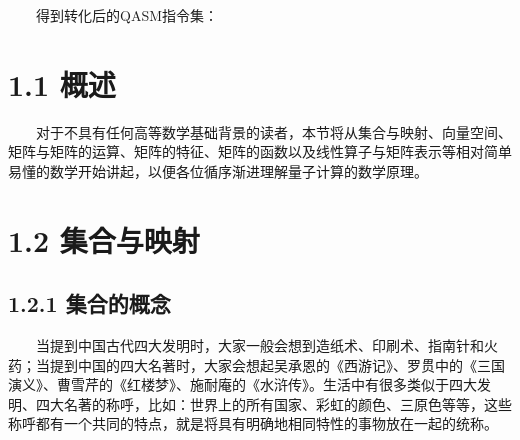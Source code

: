 \documentclass[a4paper,11pt,english]{sphinxmanual}
\begin{document}
\begin{sphinxVerbatim}[commandchars=\\\{\}]
    
\end{sphinxVerbatim}

\sphinxAtStartPar
  得到转化后的QASM指令集：

\begin{sphinxVerbatim}[commandchars=\\\{\}]
 
  \PYG{p}{[}\PYG{p}{]}
 \PYG{p}{[}\PYG{p}{]}
 \PYG{p}{[}\PYG{p}{]}
 \PYG{p}{[}\PYG{p}{]}
 \PYG{p}{[}\PYG{p}{]}
  \PYG{p}{[}\PYG{p}{]}
 \PYG{p}{[}\PYG{p}{]}  \PYG{p}{[}\PYG{p}{]}
\end{sphinxVerbatim}

\sphinxstepscope


\section{1.1 概述}
\label{\detokenize{rst/_u9644_u5f551_u91cf_u5b50_u8ba1_u7b97_u6570_u5b66_u57fa_u78401:id1}}\label{\detokenize{rst/_u9644_u5f551_u91cf_u5b50_u8ba1_u7b97_u6570_u5b66_u57fa_u78401::doc}}
\sphinxAtStartPar
  对于不具有任何高等数学基础背景的读者，本节将从集合与映射、向量空间、矩阵与矩阵的运算、矩阵的特征、矩阵的函数以及线性算子与矩阵表示等相对简单易懂的数学开始讲起，以便各位循序渐进理解量子计算的数学原理。


\section{1.2 集合与映射}
\label{\detokenize{rst/_u9644_u5f551_u91cf_u5b50_u8ba1_u7b97_u6570_u5b66_u57fa_u78401:id2}}

\subsection{1.2.1 集合的概念}
\label{\detokenize{rst/_u9644_u5f551_u91cf_u5b50_u8ba1_u7b97_u6570_u5b66_u57fa_u78401:id3}}
\sphinxAtStartPar
  当提到中国古代四大发明时，大家一般会想到造纸术、印刷术、指南针和火药；当提到中国的四大名著时，大家会想起吴承恩的《西游记》、罗贯中的《三国演义》、曹雪芹的《红楼梦》、施耐庵的《水浒传》。生活中有很多类似于四大发明、四大名著的称呼，比如：世界上的所有国家、彩虹的颜色、三原色等等，这些称呼都有一个共同的特点，就是将具有明确地相同特性的事物放在一起的统称。
\end{document}
